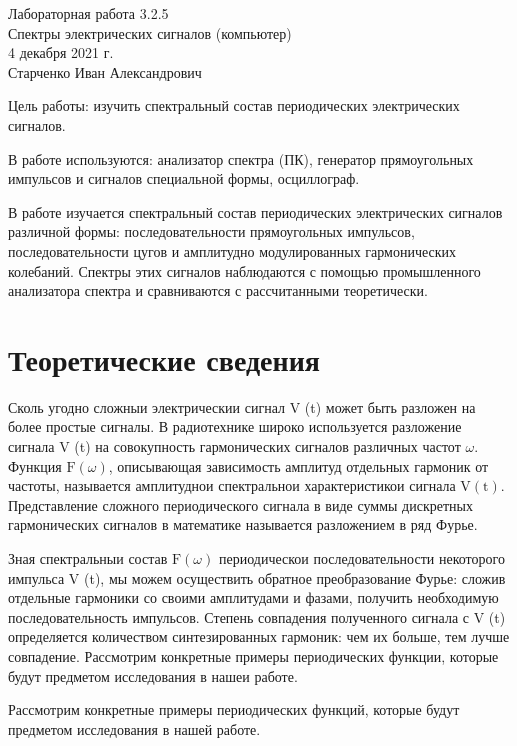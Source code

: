 \documentclass[a4paper, 12pt]{article}%
\begin{document}
\begin{center}
  \LARGE{Лабораторная работа 3.2.5}\\[0.2cm]
  \LARGE{Спектры электрических сигналов (компьютер)}\\[0.2cm]
  \large{4 декабря 2021 г.}\\[0.2cm]
  \large{Старченко Иван Александрович}\\[0.2cm]
\end{center}

$\textbf{Цель работы}$: изучить спектральный состав периодических электрических сигналов.

$\textbf{В работе используются}$: анализатор спектра (ПК), генератор прямоугольных импульсов и сигналов специальной формы, осциллограф.

В работе изучается спектральный состав периодических электрических сигналов различной формы: последовательности прямоугольных импульсов, последовательности цугов и амплитудно модулированных гармонических колебаний. Спектры этих сигналов наблюдаются с помощью промышленного анализатора спектра и сравниваются с рассчитанными теоретически. 

\section{Теоретические сведения}

Сколь угодно сложныи электрическии сигнал $\mathrm{V}$ (t) может быть разложен на более простые сигналы. В радиотехнике широко используется разложение сигнала V (t) на совокупность гармонических сигналов различных частот $\omega .$ Функция $\mathrm{F}(\omega)$, описывающая зависимость амплитуд отдельных гармоник от частоты, называется амплитуднои спектральнои характеристикои сигнала $\mathrm{V}(\mathrm{t})$. Представление сложного периодического сигнала в виде суммы дискретных гармонических сигналов в математике называется разложением в ряд Фурье.

Зная спектральныи состав $\mathrm{F}(\omega)$ периодическои последовательности некоторого импульса V (t), мы можем осуществить обратное преобразование Фурье: сложив отдельные гармоники со своими амплитудами и фазами, получить необходимую последовательность импульсов. Степень совпадения полученного сигнала с V (t) определяется количеством синтезированных гармоник: чем их больше, тем лучше совпадение.
Рассмотрим конкретные примеры периодических функции, которые будут предметом исследования в нашеи работе.

Рассмотрим конкретные примеры периодических функций, которые будут предметом исследования в нашей работе.
\end{document}

